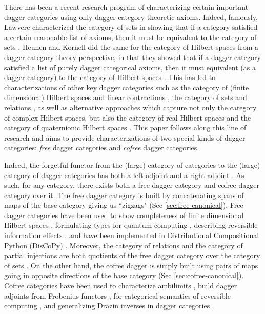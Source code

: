 \documentclass[10pt]{article}
\begin{document}
There has been a recent research program of characterizing certain important dagger categories using only dagger category theoretic axioms. Indeed, famously, Lawvere characterized the category of sets in showing that if a category satisfied a certain reasonable list of axioms, then it must be equivalent to the category of sets \cite{lawvere1964elementary}. Heunen and Kornell did the same for the category of Hilbert spaces from a dagger category theory perspective, in that they showed that if a dagger category satisfied a list of purely dagger categorical axioms, then it must equivalent (as a dagger category) to the category of Hilbert spaces \cite{heunen2022axioms}. This has led to characterizations of other key dagger categories such as the category of (finite dimensional) Hilbert spaces and linear contractions \cite{di2025dagger,https://doi.org/10.1112/blms.13010}, the category of sets and relations \cite{kornell2023axioms}, as well as alternative approaches which capture not only the category of complex Hilbert spaces, but also the category of real Hilbert spaces and the category of quaternionic Hilbert spaces \cite{paseka2025dagger,lack2025characterisation}. This paper follows along this line of research and aims to provide characterizations of two special kinds of dagger categories: \textit{free} dagger categories and \textit{cofree} dagger categories. 

Indeed, the forgetful functor from the (large) category of categories to the (large) category of dagger categories has both a left adjoint and a right adjoint \cite{heunen2009categorical}. As such, for any category, there exists both a free dagger category and cofree dagger category over it. The free dagger category is built by concatenating spans of maps of the base category giving us ``zigzags" (Sec \ref{sec:free-canonical}). Free dagger categories have been used to show completeness of finite dimensional Hilbert spaces \cite{selinger2012finite}, formulating types for quantum computing \cite{duncan2006types}, describing reversible information effects \cite{heunen2018reversible}, and have been implemented in Distributional Compositional Python (DisCoPy) \cite{toumi2023discopy}. Moreover, the category of relations and the category of partial injections are both quotients of the free dagger category over the category of sets \cite{heunen2009categorical}. On the other hand, the cofree dagger is simply built using pairs of maps going in opposite directions of the base category (Sec \ref{sec:cofree-canonical}). Cofree categories have been used to characterize ambilimits \cite{heunen2018limits,karvonen2019way}, build dagger adjoints from Frobenius functors \cite{heunen2016monads}, for categorical semantics of reversible computing \cite{jacobs2009categorical}, and generalizing Drazin inverses in dagger categories \cite{cockett2025dagger}. 
\end{document}
